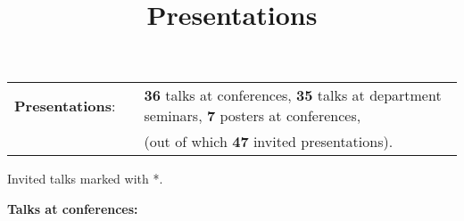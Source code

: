 \documentclass[11pt,letterpaper,sans]{moderncv}   %
\title{Presentations}
\begin{document}
\pagestyle{headonly}

\maketitle


\begin{tabular}{rcl}
\textcolor{mark_color}{\textbf{Presentations}}: &\hspace{0.3cm} &{\textbf{36} talks at conferences}, {\textbf{35} talks at department seminars}, {\textbf{7} posters at conferences,} \\
& &{(out of which \textbf{47} invited presentations).}
\end{tabular}


\vspace{0.5cm}

Invited talks marked with *.
\vspace{0.2cm}

\textcolor{color1}{\textbf{Talks at conferences:}}
\vspace{-0.5cm}
\end{document}
